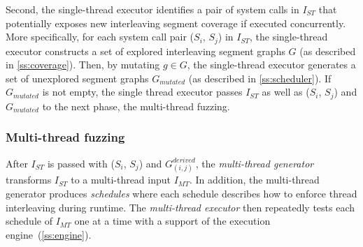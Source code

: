 Second, the single-thread executor identifies a pair of system calls
in $I_{ST}$ that potentially exposes new interleaving segment coverage
if executed concurrently.
%
More specifically, for each system call pair ($S_i$, $S_j$) in
$I_{ST}$, the single-thread executor constructs a set of explored
interleaving segment graphs $G$ (as described in
\autoref{ss:coverage}). Then, by mutating $g \in G$, the single-thread
executor generates a set of unexplored segment graphs $G_{mutated}$
(as described in \autoref{ss:scheduler}).
%
If $G_{mutated}$ is not empty, the single thread executor passes
$I_{ST}$ as well as ($S_i$, $S_j$) and $G_{mutated}$ to the next
phase, the multi-thread fuzzing.




%







\subsubsection{Multi-thread fuzzing}
\label{sss:multithreadfuzzing}
%
After $I_{ST}$ is passed with ($S_i$, $S_j$) and
$G^{derived}_{(i,j)}$, the \textit{multi-thread generator} transforms
$I_{ST}$ to a multi-thread input $I_{MT}$.
%
In addition, the multi-thread generator produces \textit{schedules}
where each schedule describes how to enforce thread interleaving
during runtime.
%
The \textit{multi-thread executor} then repeatedly tests each schedule
of $I_{MT}$ one at a time with a support of the execution
engine~(\autoref{ss:engine}).


